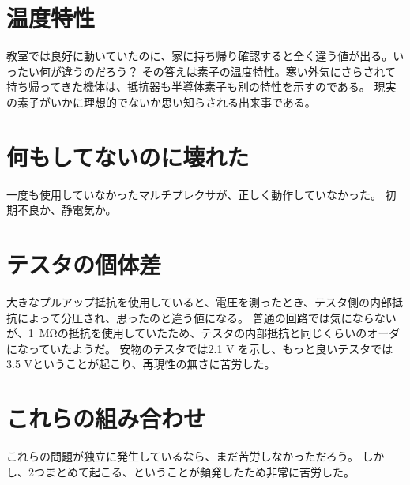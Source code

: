 \documentclass{ltjsreport}
\begin{document}
\section{温度特性}
教室では良好に動いていたのに、家に持ち帰り確認すると全く違う値が出る。いったい何が違うのだろう？
その答えは素子の温度特性。寒い外気にさらされて持ち帰ってきた機体は、抵抗器も半導体素子も別の特性を示すのである。
現実の素子がいかに理想的でないか思い知らされる出来事である。

\section{何もしてないのに壊れた}
一度も使用していなかったマルチプレクサが、正しく動作していなかった。
初期不良か、静電気か。

\section{テスタの個体差}
大きなプルアップ抵抗を使用していると、電圧を測ったとき、テスタ側の内部抵抗によって分圧され、思ったのと違う値になる。
普通の回路では気にならないが、\SI{1}{\Mohm}の抵抗を使用していたため、テスタの内部抵抗と同じくらいのオーダになっていたようだ。
安物のテスタでは2.1 V を示し、もっと良いテスタでは3.5 Vということが起こり、再現性の無さに苦労した。

\section{これらの組み合わせ}
これらの問題が独立に発生しているなら、まだ苦労しなかっただろう。
しかし、2つまとめて起こる、ということが頻発したため非常に苦労した。
\end{document}

